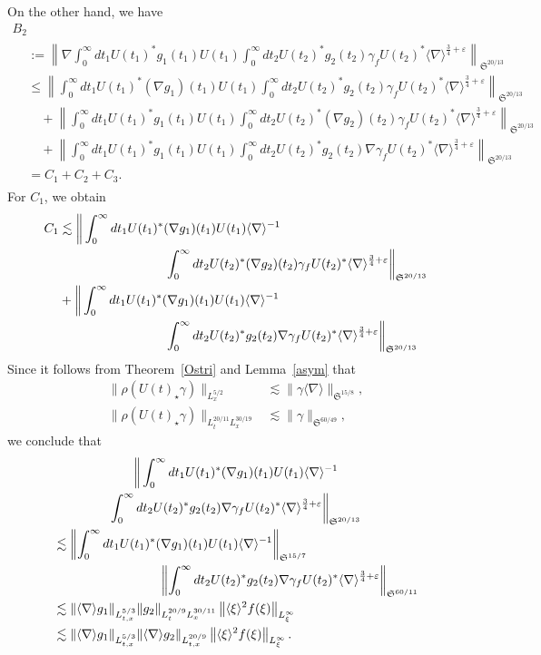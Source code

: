 \documentclass[AHL,Unicode,longabstracts,MathTools,published]{cedram}
\newcommand{\FS}{\mathfrak{S}}
\newcommand{\ga}{\gamma}
\newcommand{\ep}{\varepsilon}
\newcommand{\rh}{\rho}
\renewcommand{\No}[1]{\left\| #1 \right\|}
\newcommand{\I}{\infty}
\newcommand{\sd}{\langle \nabla \rangle}
\newcommand{\sdi}{\sd^{-1}}
\newcommand{\lxr}{\langle \xi \rangle}
\newcommand{\tx}{{t,x}}
\newcommand{\st}{\star}
\newcommand{\fh}{\frac{3}{4}}
\newcommand{\na}{\nabla}
\newcommand{\ls}{\lesssim}
\begin{document}
On the other hand, we have
\begin{multline}
B_2\\
\begin{aligned}
&:= \No{\na \int_0^\I dt_1 U(t_1)^* g_1(t_1) U(t_1) \int_0^\I dt_2 U(t_2)^* g_2(t_2)\ga_f U(t_2)^* \sd^{\fh+\ep} }_{\FS^{20/13}} \\
&\le \No{\int_0^\I dt_1 U(t_1)^* (\na g_1)(t_1) U(t_1) \int_0^\I dt_2 U(t_2)^* g_2(t_2)\ga_f U(t_2)^* \sd^{\fh+\ep} }_{\FS^{20/13}} \\
&\quad + \No{\int_0^\I dt_1 U(t_1)^* g_1(t_1) U(t_1) \int_0^\I dt_2 U(t_2)^* (\na g_2)(t_2)\ga_f U(t_2)^* \sd^{\fh+\ep} }_{\FS^{20/13}} \\
&\quad + \No{\int_0^\I dt_1 U(t_1)^* g_1(t_1) U(t_1) \int_0^\I dt_2 U(t_2)^* g_2(t_2) \na \ga_f U(t_2)^* \sd^{\fh+\ep} }_{\FS^{20/13}} \\
&= C_1 + C_2 + C_3.
\end{aligned}
\end{multline}
For $C_1$, we obtain
\begin{equation}
\begin{split}
C_1 &\ls \bigg\|\int_0^\I dt_1 U(t_1)^* (\na g_1)(t_1) U(t_1) \sdi\\
&\mkern150mu\int_0^\I dt_2 U(t_2)^* (\na g_2)(t_2)\ga_f U(t_2)^* \sd^{\fh+\ep} \bigg\|_{\FS^{20/13}} \\
&+ \bigg\|\int_0^\I dt_1 U(t_1)^* (\na g_1)(t_1) U(t_1) \sdi \\
&\mkern150mu\int_0^\I dt_2 U(t_2)^* g_2(t_2)\na \ga_f U(t_2)^* \sd^{\fh+\ep}\bigg\|_{\FS^{20/13}}
\end{split}
\end{equation}
Since it follows from Theorem~\ref{Ostri} and Lemma~\ref{asym} that
\begin{align}
\|\rh(U(t)_\st \ga)\|_{L^{5/2}_x} &\ls \|\ga \sd \|_{\FS^{15/8}}, \\
\|\rh(U(t)_\st \ga)\|_{L^{20/11}_t L^{30/19}_x} &\ls \|\ga \|_{\FS^{60/49}},
\end{align}
we conclude that
\begin{multline}
\bigg\|\int_0^\I dt_1 U(t_1)^* (\na g_1)(t_1) U(t_1) \sdi \\
\int_0^\I dt_2 U(t_2)^* g_2(t_2) \na \ga_f U(t_2)^* \sd^{\fh+\ep} \bigg\|_{\FS^{20/13}} \\
\begin{aligned}
&\ls \No{\int_0^\I dt_1 U(t_1)^* (\na g_1)(t_1) U(t_1) \sdi}_{\FS^{15/7}}\\
&\mkern150mu\No{\int_0^\I dt_2 U(t_2)^* g_2(t_2) \na \ga_f U(t_2)^* \sd^{\fh+\ep} }_{\FS^{60/11}} \\
&\ls \|\sd g_1\|_{L^{5/3}_\tx} \|g_2\|_{L^{20/9}_t L^{30/11}_x} \left\|\lxr^2 f(\xi)\right\|_{L^\I_\xi}\\
&\ls \|\sd g_1\|_{L^{5/3}_\tx} \|\sd g_2\|_{L^{20/9}_\tx} \left\|\lxr^2 f(\xi)\right\|_{L^\I_\xi}.
\end{aligned}
\end{multline}
\end{document}
